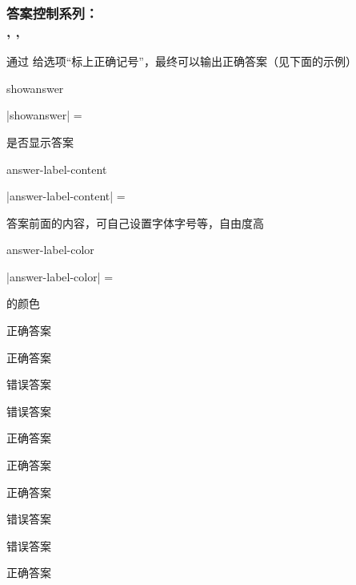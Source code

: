 \documentclass{xdyy-usermanual}
\begin{document}
\subsubsection{ 答案控制系列：\\ , ,  }\label{subsubsec:答案控制}

通过  给选项“标上正确记号”，最终可以输出正确答案（见下面的示例） 

\begin{function}{showanswer}
  \begin{syntax}
    |showanswer| =   
  \end{syntax}
  是否显示答案
\end{function}

\begin{function}{answer-label-content}
  \begin{syntax}
    |answer-label-content| =   
  \end{syntax}
  答案前面的内容，可自己设置字体字号等，自由度高
\end{function}

\begin{function}{answer-label-color}
  \begin{syntax}
    |answer-label-color| =    
  \end{syntax}
   的颜色
\end{function}

\begin{vexample}
    \begin{xchoices}[showanswer]
      \item* 正确答案
      \item* 正确答案
      \item 错误答案
      \item 错误答案
      \item* 正确答案
    \end{xchoices}
\end{vexample}

\begin{vexample}
    \begin{xchoices}[
      label-style = quan,
      showanswer,
      answer-label-content = {\large \textbf{【标准答案】}},
      answer-label-color = {pink}
    ]
      \item* 正确答案
      \item* 正确答案
      \item 错误答案
      \item 错误答案
      \item* 正确答案
    \end{xchoices}
\end{vexample}
\end{document}
